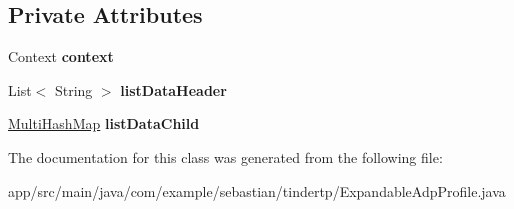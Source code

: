 \subsection*{Private Attributes}
\begin{DoxyCompactItemize}
\item 
Context {\bfseries context}\hypertarget{classcom_1_1example_1_1sebastian_1_1tindertp_1_1ExpandableAdpProfile_aaecba08360b5781c17e0a65f04838780}{}\label{classcom_1_1example_1_1sebastian_1_1tindertp_1_1ExpandableAdpProfile_aaecba08360b5781c17e0a65f04838780}

\item 
List$<$ String $>$ {\bfseries list\+Data\+Header}\hypertarget{classcom_1_1example_1_1sebastian_1_1tindertp_1_1ExpandableAdpProfile_a32ac8e9836e05e38ce272414110eba5e}{}\label{classcom_1_1example_1_1sebastian_1_1tindertp_1_1ExpandableAdpProfile_a32ac8e9836e05e38ce272414110eba5e}

\item 
\hyperlink{classcom_1_1example_1_1sebastian_1_1tindertp_1_1commonTools_1_1MultiHashMap}{Multi\+Hash\+Map} {\bfseries list\+Data\+Child}\hypertarget{classcom_1_1example_1_1sebastian_1_1tindertp_1_1ExpandableAdpProfile_a9956a3fca41bab55dd950596b5a7260e}{}\label{classcom_1_1example_1_1sebastian_1_1tindertp_1_1ExpandableAdpProfile_a9956a3fca41bab55dd950596b5a7260e}

\end{DoxyCompactItemize}


The documentation for this class was generated from the following file\+:\begin{DoxyCompactItemize}
\item 
app/src/main/java/com/example/sebastian/tindertp/Expandable\+Adp\+Profile.\+java\end{DoxyCompactItemize}
